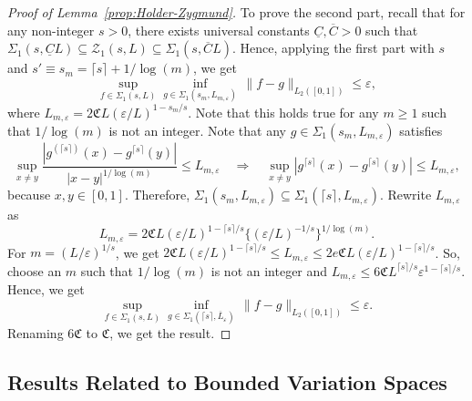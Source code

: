 \documentclass[12pt]{article}
\begin{document}
\begin{appendices}
\begin{proof}[Proof of Lemma~\ref{prop:Holder-Zygmund}]
To prove the second part, recall that for any non-integer $ s > 0$, there exists universal constants $\underline{C}, \overline{C} > 0$ such that  $\Sigma_1( s, \underline{C}L) \subseteq \mathcal{Z}_1( s, L) \subseteq \Sigma_1( s, \overline{C}L)$. Hence, applying the first part with $ s$ and $ s' \equiv  s_m = \lceil s\rceil + 1/\log(m)$, we get
\[
\sup_{f\in\Sigma_1( s, L)}\inf_{g\in\Sigma_1( s_m, L_{m,\varepsilon})}\,\|f - g\|_{L_2([0, 1])} \le \varepsilon,
\]
where $L_{m,\varepsilon} = 2\mathfrak{C}L(\varepsilon/L)^{1 -  s_m/ s}$. Note that this holds true for any $m\ge1$ such that $1/\log(m)$ is not an integer. 
Note that any $g\in\Sigma_1( s_m, L_{m,\varepsilon})$ satisfies
\[
\sup_{x\neq y}\frac{|g^{(\lceil s\rceil)}(x) - g^{\lceil s\rceil}(y)|}{|x - y|^{1/\log(m)}} \le L_{m,\varepsilon}\quad\Longrightarrow\quad \sup_{x\neq y}|g^{\lceil s\rceil}(x) - g^{\lceil s\rceil}(y)| \le L_{m,\varepsilon},
\]
because $x, y\in[0, 1]$. Therefore, $\Sigma_1( s_m, L_{m,\varepsilon}) \subseteq \Sigma_1(\lceil s\rceil, L_{m,\varepsilon}).$ Rewrite $L_{m,\varepsilon}$ as 
\[
L_{m,\varepsilon} = 2\mathfrak{C}L(\varepsilon/L)^{1-\lceil s\rceil/ s}\{(\varepsilon/L)^{-1/ s}\}^{1/\log(m)}.
\]
For $m = (L/\varepsilon)^{1/ s}$, we get $2\mathfrak{C}L(\varepsilon/L)^{1-\lceil s\rceil/ s} \le L_{m,\varepsilon} \le 2e\mathfrak{C}L(\varepsilon/L)^{1-\lceil s\rceil/ s}$. So, choose an $m$ such that $1/\log(m)$ is not an integer and $L_{m,\varepsilon} \le 6\mathfrak{C}L^{\lceil s\rceil/ s}\varepsilon^{1 - \lceil s\rceil/ s}$. Hence, we get
\[
\sup_{f\in\Sigma_1( s, L)}\inf_{g\in\Sigma_1(\lceil s\rceil, \overline{L}_{\varepsilon})}\,\|f - g\|_{L_2([0, 1])} \le \varepsilon.
\]
Renaming $6\mathfrak{C}$ to $\mathfrak{C}$, we get the result.
\end{proof}

\subsection{Results Related to Bounded Variation Spaces}\label{app: bv proof}


\end{appendices}
\end{document}
